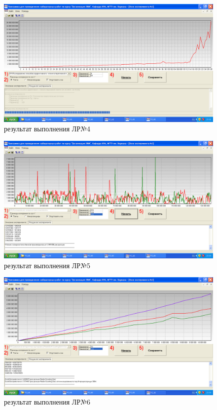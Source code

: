 \begin{figure}
	\centering
	\includegraphics[width=1\linewidth]{../images/screenshot009}
	\caption{результат выполнения ЛР№4}
	\label{fig:screenshot009}
\end{figure}
\begin{figure}
	\centering
	\includegraphics[width=1\linewidth]{../images/screenshot007}
	\caption{результат выполнения ЛР№5}
	\label{fig:screenshot007}
\end{figure}
\begin{figure}
	\centering
	\includegraphics[width=1\linewidth]{../images/screenshot008}
	\caption{результат выполнения ЛР№6}
	\label{fig:screenshot008}
\end{figure}

